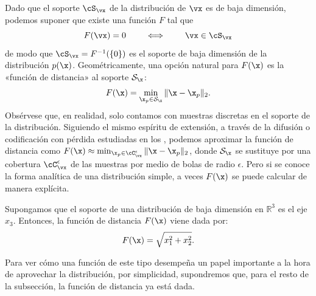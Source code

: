 \documentclass[../../book-main_es.tex]{subfiles}
\begin{document}
Dado que el soporte \(\cS_{\vx}\) de la distribución de \(\vx\) es
de baja dimensión, podemos suponer que existe una función \(F\) tal que
\begin{equation}
    F(\vx) = {0} \qquad \iff \qquad \vx \in \cS_{\vx}
\end{equation}
de modo que \(\cS_{\vx} = F^{-1}(\{0\})\) es el soporte de baja dimensión
de la distribución $p(\x)$. Geométricamente, una opción natural
para $F(\x)$ es la «función de distancia» al soporte
$\mathcal{S}_{\x}$:
\begin{equation}
    F(\x) = \min_{\x_p \in \mathcal{S}_{\x}} \|\x - \x_p\|_2.
    \label{eqn:F-definition}
\end{equation}
Obsérvese que, en realidad, solo contamos con muestras discretas en el soporte
de la distribución. Siguiendo el mismo espíritu de extensión, a través de
la difusión o codificación con pérdida estudiadas en los
, podemos aproximar la función de distancia
como $F(\x) \approx \min_{\x_p \in \cC_{\vx}^{\epsilon}} \|\x
- \x_p\|_2$, donde $\mathcal{S}_{\x}$ se sustituye por una cobertura
\(\cC_{\vx}^{\epsilon}\) de las muestras por medio de bolas de radio $\epsilon$. Pero si
se conoce la forma analítica de una distribución simple, a veces
$F(\x)$ se puede calcular de manera explícita.
\begin{example}
    Supongamos que el soporte de una distribución de baja dimensión
    en $\mathbb{R}^3$ es el eje $x_3$. Entonces, la función de distancia
    $F(\x)$ viene dada por:
    \begin{equation}
        F(\x) = \sqrt{x_1^2 + x_2^2}.
    \end{equation}
    \label{eg:distance-line}
\end{example}
Para ver cómo una función de este tipo desempeña un papel importante a la hora de aprovechar la
distribución, por simplicidad, supondremos que, para el resto de
la subsección, la función de distancia ya está dada.
\end{document}
